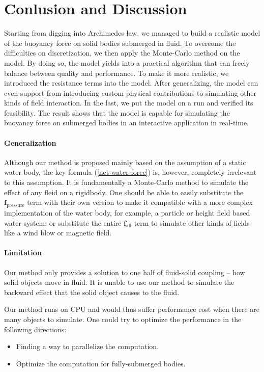 \section{Conlusion and Discussion}

Starting from digging into Archimedes law, we managed to build a realistic model of the buoyancy force on solid bodies submerged in fluid.
To overcome the difficulties on discretization, we then apply the Monte-Carlo method on the model.
By doing so, the model yields into a practical algorithm that can freely balance between quality and performance.
To make it more realistic, we introduced the resistance terms into the model.
After generalizing, the model can even support from introducing custom physical contributions to simulating other kinds of field interaction.
In the last, we put the model on a run and verified its feasibility.
The result shows that the model is capable for simulating the buoyancy force on submerged bodies in an interactive application in real-time.

\paragraph*{Generalization}

Although our method is proposed mainly based on the assumption of a static water body,
the key formula (\ref{net-water-force}) is, however, completely irrelevant to this assumption.
It is fundamentally a Monte-Carlo method to simulate the effect of any fleid on a rigidbody.
One should be able to easily substitute the $\mathbf{f}_{\text{pressure}}$ term with their own version to make it compatible with a more complex implementation of the water body, for example, a particle or height field based water system; or substitute the entire $\mathbf{f}_{\text{all}}$ term to simulate other kinds of fields like a wind blow or magnetic field.

\paragraph*{Limitation}

Our method only provides a solution to one half of fluid-solid coupling -- how solid objects move in fluid.
It is unable to use our method to simulate the backward effect that the solid object causes to the fluid.

Our method runs on CPU and would thus suffer performance cost when there are many objects to simulate.
One could try to optimize the performance in the following directions:
\begin{itemize}
	\item Finding a way to parallelize the computation.
	\item Optimize the computation for fully-submerged bodies.
\end{itemize}

